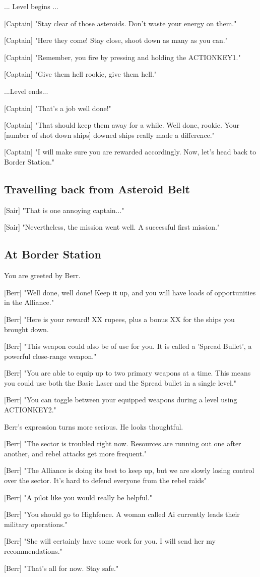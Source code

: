 \documentclass[a4paper,12pt]{article}
\begin{document}
... Level begins ...

[Captain] "Stay clear of those asteroids. Don't waste your energy on them."

[Captain] "Here they come! Stay close, shoot down as many as you can." 

[Captain] "Remember, you fire by pressing and holding the ACTIONKEY1." 

[Captain] "Give them hell rookie, give them hell."

...Level ends...

[Captain] "That's a job well done!" 

[Captain] "That should keep them away for a while. Well done, rookie. Your [number of shot down ships] downed ships really made a difference."

[Captain] "I will make sure you are rewarded accordingly. Now, let's head back to Border Station."

\subsection{Travelling back from Asteroid Belt}

[Sair] "That is one annoying captain..." 

[Sair] "Nevertheless, the mission went well. A successful first mission."

\subsection{At Border Station}

You are greeted by Berr. 

[Berr] "Well done, well done! Keep it up, and you will have loads of opportunities
in the Alliance." 

[Berr] "Here is your reward! XX rupees, plus a bonus XX for the ships you brought down. 

[Berr] "This weapon could also be of use for you. It is called a 'Spread Bullet', a powerful close-range weapon."

[Berr] "You are able to equip up to two primary weapons at a time. This means you could use both the Basic Laser and 
the Spread bullet in a single level."

[Berr] "You can toggle between your equipped weapons during a level using ACTIONKEY2."

Berr's expression turns more serious. He looks thoughtful.

[Berr] "The sector is troubled right now. Resources are running out one after another,
and rebel attacks get more frequent."

[Berr] "The Alliance is doing its best to keep up, but we are slowly losing control over the sector. It's hard to defend
everyone from the rebel raids"

[Berr] "A pilot like you would really be helpful."

[Berr] "You should go to Highfence. A woman called Ai currently leads their military operations."

[Berr] "She will certainly have some work for you. I will send her my recommendations."

[Berr] "That's all for now. Stay safe."
\end{document}

